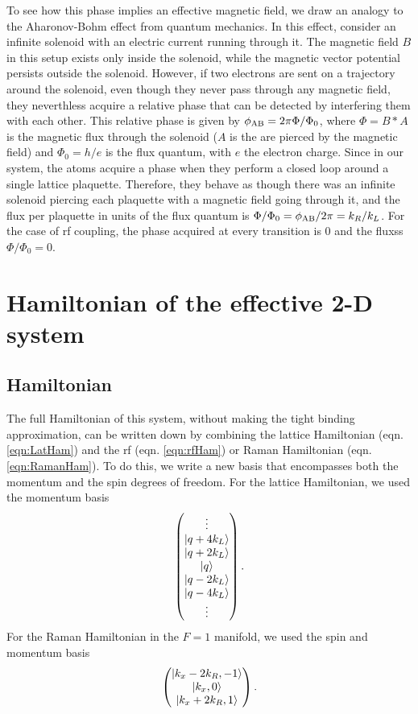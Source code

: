 To see how this phase implies an effective magnetic field, we draw an analogy to the Aharonov-Bohm effect\cite{Aharonov1959, Aharonov1992} from quantum mechanics. In this effect, consider an infinite solenoid with an electric current running through it. The magnetic field $B$ in this setup exists only inside the solenoid, while the magnetic vector potential persists outside the solenoid.  However, if two electrons are sent on a trajectory around the solenoid, even though they never pass through any magnetic field, they neverthless acquire a relative phase that can be detected by interfering them with each other. This relative phase is given by $\phi_{\rm AB} =2 \pi \Phi/\Phi_0$, where $\Phi = B*A$ is the magnetic flux through the solenoid ($A$ is the are pierced by the magnetic field) and $\Phi_0=h/e$ is the flux quantum, with $e$ the electron charge. Since in our system, the atoms acquire a phase when they perform a closed loop around a single lattice plaquette. Therefore, they behave as though there was an infinite solenoid piercing each plaquette with a magnetic field going through it, and the flux per plaquette in units of the flux quantum is $\Phi/\Phi_0=\phi_{\rm AB}/2\pi =  k_R/k_L$. For the case of rf coupling, the phase acquired at every transition is $0$ and the fluxss $\Phi/\Phi_0=0$.

\section{Hamiltonian of the effective 2-D system}

\subsection{Hamiltonian}
The full Hamiltonian of this system, without making the tight binding approximation, can be written down by combining the lattice Hamiltonian (eqn. \ref{eqn:LatHam}) and the rf (eqn. \ref{eqn:rfHam}) or Raman Hamiltonian (eqn. \ref{eqn:RamanHam}). To do this, we write a new basis that encompasses both the momentum and the spin degrees of freedom. For the lattice Hamiltonian, we used the momentum basis
\begin{equation}
 \begin{pmatrix} \vdots \\
\mathinner{|{q+4 k_L}\rangle}\\
\mathinner{|{q+2 k_L}\rangle}\\
\mathinner{|{q}\rangle}\\
\mathinner{|{q -2 k_L}\rangle}\\
\mathinner{|{q - 4 k_L}\rangle}\\
\vdots
\end{pmatrix} \\.
\end{equation}
For the Raman Hamiltonian in the $F=1$ manifold, we used the spin and momentum basis
\begin{equation}
\begin{pmatrix}
\mathinner{|{k_x-2k_R,-1}\rangle}\\
 \mathinner{|{k_x,0}\rangle}\\
\mathinner{|{k_x+2k_R,1}\rangle}
\end{pmatrix}\\.
\end{equation}


